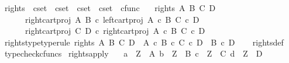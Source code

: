 \begin{isabellebody}
\isadelimproof
\isanewline
%
\endisadelimproof
\isanewline
{}\isamarkupfalse%
\ rights\ {\isacharcolon}{\kern0pt}{\isacharcolon}{\kern0pt}\ {\isachardoublequoteopen}cset\ {\isasymRightarrow}\ cset\ {\isasymRightarrow}\ cset\ {\isasymRightarrow}\ cset\ {\isasymRightarrow}\ cfunc{\isachardoublequoteclose}\ \isanewline
\ \ {\isachardoublequoteopen}rights\ A\ B\ C\ D\ {\isacharequal}{\kern0pt}\ {\isasymlangle}\isanewline
\ \ \ \ \ \ right{\isacharunderscore}{\kern0pt}cart{\isacharunderscore}{\kern0pt}proj\ A\ B\ {\isasymcirc}\isactrlsub c\ left{\isacharunderscore}{\kern0pt}cart{\isacharunderscore}{\kern0pt}proj\ {\isacharparenleft}{\kern0pt}A\ {\isasymtimes}\isactrlsub c\ B{\isacharparenright}{\kern0pt}\ {\isacharparenleft}{\kern0pt}C\ {\isasymtimes}\isactrlsub c\ D{\isacharparenright}{\kern0pt}{\isacharcomma}{\kern0pt}\isanewline
\ \ \ \ \ \ right{\isacharunderscore}{\kern0pt}cart{\isacharunderscore}{\kern0pt}proj\ C\ D\ {\isasymcirc}\isactrlsub c\ right{\isacharunderscore}{\kern0pt}cart{\isacharunderscore}{\kern0pt}proj\ {\isacharparenleft}{\kern0pt}A\ {\isasymtimes}\isactrlsub c\ B{\isacharparenright}{\kern0pt}\ {\isacharparenleft}{\kern0pt}C\ {\isasymtimes}\isactrlsub c\ D{\isacharparenright}{\kern0pt}\isanewline
\ \ \ \ {\isasymrangle}{\isachardoublequoteclose}\isanewline
\isanewline
{}\isamarkupfalse%
\ rights{\isacharunderscore}{\kern0pt}type{\isacharbrackleft}{\kern0pt}type{\isacharunderscore}{\kern0pt}rule{\isacharbrackright}{\kern0pt}{\isacharcolon}{\kern0pt}\ {\isachardoublequoteopen}rights\ A\ B\ C\ D\ {\isacharcolon}{\kern0pt}\ {\isacharparenleft}{\kern0pt}A\ {\isasymtimes}\isactrlsub c\ B{\isacharparenright}{\kern0pt}\ {\isasymtimes}\isactrlsub c\ {\isacharparenleft}{\kern0pt}C\ {\isasymtimes}\isactrlsub c\ D{\isacharparenright}{\kern0pt}\ {\isasymrightarrow}\ {\isacharparenleft}{\kern0pt}B\ {\isasymtimes}\isactrlsub c\ D{\isacharparenright}{\kern0pt}{\isachardoublequoteclose}\isanewline
%
\isadelimproof
\ \ %
\endisadelimproof
%
\isatagproof
{}\isamarkupfalse%
\ rights{\isacharunderscore}{\kern0pt}def\ \isamarkupfalse%
\ typecheck{\isacharunderscore}{\kern0pt}cfuncs%
\endisatagproof
{\isafoldproof}%
%
\isadelimproof
\isanewline
%
\endisadelimproof
\isanewline
{}\isamarkupfalse%
\ rights{\isacharunderscore}{\kern0pt}apply{\isacharcolon}{\kern0pt}\isanewline
\ \ \ {\isachardoublequoteopen}a\ {\isacharcolon}{\kern0pt}\ Z\ {\isasymrightarrow}\ A{\isachardoublequoteclose}\ {\isachardoublequoteopen}b\ {\isacharcolon}{\kern0pt}\ Z\ {\isasymrightarrow}\ B{\isachardoublequoteclose}\ {\isachardoublequoteopen}c\ {\isacharcolon}{\kern0pt}\ Z\ {\isasymrightarrow}\ C{\isachardoublequoteclose}\ {\isachardoublequoteopen}d\ {\isacharcolon}{\kern0pt}\ Z\ {\isasymrightarrow}\ D{\isachardoublequoteclose}\isanewline

\end{isabellebody}
